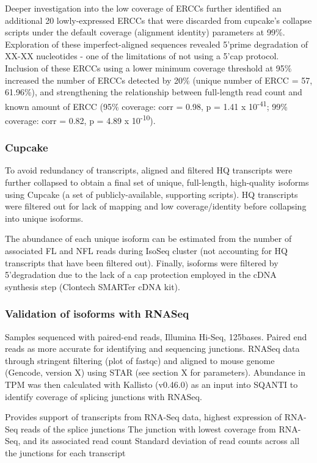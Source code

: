 Deeper investigation into the low coverage of ERCCs further identified an additional 20 lowly-expressed ERCCs that were discarded from cupcake's collapse scripts under the default coverage (alignment identity) parameters at 99\%. Exploration of these imperfect-aligned sequences revealed 5'prime degradation of XX-XX nucleotides - one of the limitations of not using a 5'cap protocol. Inclusion of these ERCCs using a lower minimum coverage threshold at 95\% increased the number of ERCCs detected by 20\% (unique number of ERCC = 57, 61.96\%), and strengthening the relationship between full-length read count and known amount of ERCC (95\% coverage: corr = 0.98, p = 1.41 x 10\textsuperscript{-41}; 99\% coverage: corr = 0.82, p = 4.89 x 10\textsuperscript{-10}).   


\subsubsection{Cupcake}
To avoid redundancy of transcripts, aligned and filtered HQ transcripts were further collapsed to obtain a final set of unique, full-length, high-quality isoforms using Cupcake (a set of publicly-available, supporting scripts). HQ transcripts were filtered out for lack of mapping and low coverage/identity before collapsing into unique isoforms.  

The abundance of each unique isoform can be estimated from the number of associated FL and NFL reads during IsoSeq cluster (not accounting for HQ transcripts that have been filtered out).  Finally, isoforms were filtered by 5’degradation due to the lack of a cap protection employed in the cDNA synthesis step (Clontech SMARTer cDNA kit). 

\subsubsection{Validation of isoforms with RNASeq} 
\label{section:ch2_rnaseq_support_bioinformatics}
Samples sequenced with paired-end reads, Illumina Hi-Seq, 125bases. Paired end reads as more accurate for identifying and sequencing junctions. RNASeq data through stringent filtering (plot of fastqc) and aligned to mouse genome (Gencode, version X) using STAR (see section X for parameters). Abundance in TPM was then calculated with Kallisto (v0.46.0) \cite{Bray2016} as an input into SQANTI to identify coverage of splicing junctions with RNASeq.  

Provides support of transcripts from RNA-Seq data, highest expression of RNA-Seq reads of the splice junctions 
The junction with lowest coverage from RNA-Seq, and its associated read count 	
Standard deviation of read counts across all the junctions for each transcript 


